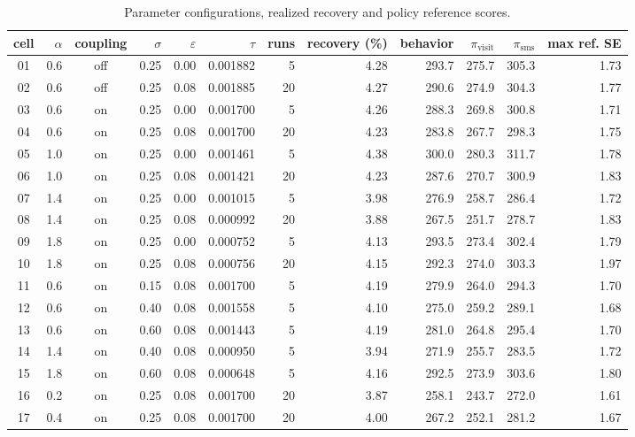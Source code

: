 \begin{table}[!htbp]
\centering
\caption{Parameter configurations, realized recovery and policy reference scores.}
\label{tab:gridvalues}
\footnotesize
\begin{adjustbox}{max width=\linewidth}
\begin{tabular}{crcrrrrrrrrr}
\toprule
cell & $\alpha$ & coupling & $\sigma$ & $\varepsilon$ & $\tau$ & runs & recovery (\%) & behavior & $\pi_{\mathrm{visit}}$ & $\pi_{\mathrm{sms}}$ & max ref. SE \\
\midrule
01 & 0.6 & off & 0.25 & 0.00 & 0.001882 & 5 & 4.28 & 293.7 & 275.7 & 305.3 & 1.73 \\
02 & 0.6 & off & 0.25 & 0.08 & 0.001885 & 20 & 4.27 & 290.6 & 274.9 & 304.3 & 1.77 \\
03 & 0.6 & on & 0.25 & 0.00 & 0.001700 & 5 & 4.26 & 288.3 & 269.8 & 300.8 & 1.71 \\
04 & 0.6 & on & 0.25 & 0.08 & 0.001700 & 20 & 4.23 & 283.8 & 267.7 & 298.3 & 1.75 \\
05 & 1.0 & on & 0.25 & 0.00 & 0.001461 & 5 & 4.38 & 300.0 & 280.3 & 311.7 & 1.78 \\
06 & 1.0 & on & 0.25 & 0.08 & 0.001421 & 20 & 4.23 & 287.6 & 270.7 & 300.9 & 1.83 \\
07 & 1.4 & on & 0.25 & 0.00 & 0.001015 & 5 & 3.98 & 276.9 & 258.7 & 286.4 & 1.72 \\
08 & 1.4 & on & 0.25 & 0.08 & 0.000992 & 20 & 3.88 & 267.5 & 251.7 & 278.7 & 1.83 \\
09 & 1.8 & on & 0.25 & 0.00 & 0.000752 & 5 & 4.13 & 293.5 & 273.4 & 302.4 & 1.79 \\
10 & 1.8 & on & 0.25 & 0.08 & 0.000756 & 20 & 4.15 & 292.3 & 274.0 & 303.3 & 1.97 \\
11 & 0.6 & on & 0.15 & 0.08 & 0.001700 & 5 & 4.19 & 279.9 & 264.0 & 294.3 & 1.70 \\
12 & 0.6 & on & 0.40 & 0.08 & 0.001558 & 5 & 4.10 & 275.0 & 259.2 & 289.1 & 1.68 \\
13 & 0.6 & on & 0.60 & 0.08 & 0.001443 & 5 & 4.19 & 281.0 & 264.8 & 295.4 & 1.70 \\
14 & 1.4 & on & 0.40 & 0.08 & 0.000950 & 5 & 3.94 & 271.9 & 255.7 & 283.5 & 1.72 \\
15 & 1.8 & on & 0.60 & 0.08 & 0.000648 & 5 & 4.16 & 292.5 & 273.9 & 303.6 & 1.80 \\
16 & 0.2 & on & 0.25 & 0.08 & 0.001700 & 20 & 3.87 & 258.1 & 243.7 & 272.0 & 1.61 \\
17 & 0.4 & on & 0.25 & 0.08 & 0.001700 & 20 & 4.00 & 267.2 & 252.1 & 281.2 & 1.67 \\
\bottomrule
\end{tabular}
\end{adjustbox}
\end{table}
